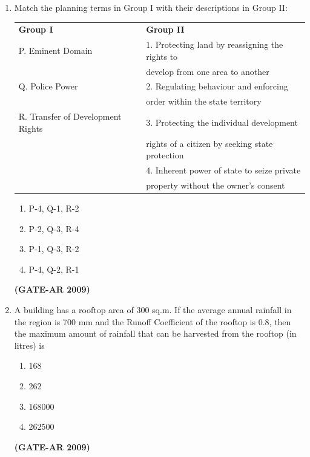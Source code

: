 \documentclass[a4paper,10pt]{article}
\begin{document}
\begin{enumerate}
    \item Match the planning terms in Group I with their descriptions in Group II:  \\
    \begin{tabular}{ l l }
	\textbf{Group I} & \textbf{Group II} \\
	P. Eminent Domain & 1. Protecting land by reassigning the rights to \\
	    & develop from one area to another \\
	Q. Police Power & 2. Regulating behaviour and enforcing \\
	    & order within the state territory \\
	R. Transfer of Development Rights & 3. Protecting the individual development \\
	    & rights of a citizen by seeking state protection \\
	& 4. Inherent power of state to seize private \\
	    & property without the owner’s consent \\
	\end{tabular}
	\begin{multicols}{2}
	\begin{enumerate}
        \item P-4, Q-1, R-2
        \item P-2, Q-3, R-4
        \item P-1, Q-3, R-2
        \item P-4, Q-2, R-1
    \end{enumerate}
	\end{multicols}
    \hfill \textbf{(GATE-AR 2009)}

    \item A building has a rooftop area of 300 sq.m. If the average annual rainfall in the region is 700 mm and the Runoff Coefficient of the rooftop is 0.8, then the maximum amount of rainfall that can be harvested from the rooftop (in litres) is 
    \begin{multicols}{2}
	\begin{enumerate}
        \item 168
        \item 262
        \item 168000
        \item 262500
    \end{enumerate}
	\end{multicols}
    \hfill \textbf{(GATE-AR 2009)}


\end{enumerate}
\end{document}
